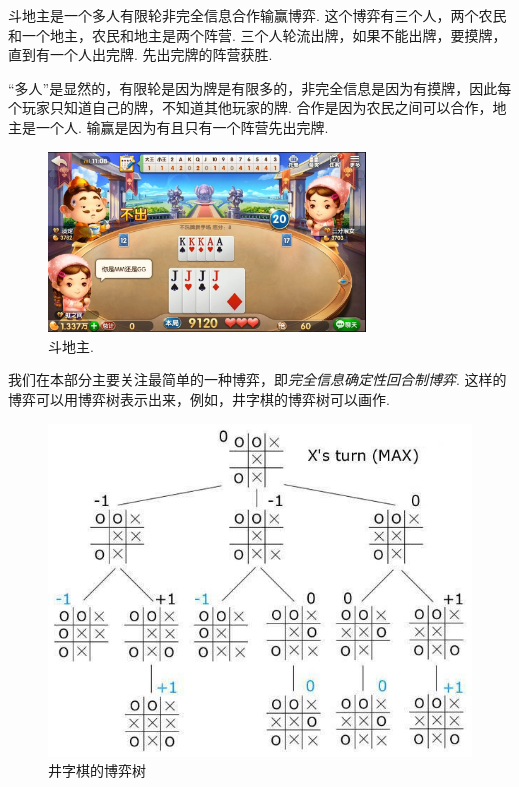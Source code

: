 \begin{example}
    斗地主是一个多人有限轮非完全信息合作输赢博弈. 这个博弈有三个人，两个农民和一个地主，农民和地主是两个阵营. 三个人轮流出牌，如果不能出牌，要摸牌，直到有一个人出完牌. 先出完牌的阵营获胜. 

    “多人”是显然的，有限轮是因为牌是有限多的，非完全信息是因为有摸牌，因此每个玩家只知道自己的牌，不知道其他玩家的牌. 合作是因为农民之间可以合作，地主是一个人. 输赢是因为有且只有一个阵营先出完牌.
\begin{figure}
    \centering
    \includegraphics[width=0.75\textwidth]{Figures/game/fight-landlord.jpg}
    \caption{斗地主.}
\end{figure}
\end{example}

我们在本部分主要关注最简单的一种博弈，即\emph{完全信息确定性回合制博弈}. 这样的博弈可以用博弈树表示出来，例如，井字棋的博弈树可以画作.

\begin{figure}
    \centering
    \includegraphics[scale=0.4]{Figures/game/gametree.jpg}
    \caption{井字棋的博弈树}
    \label{fig:gametree}
\end{figure}

